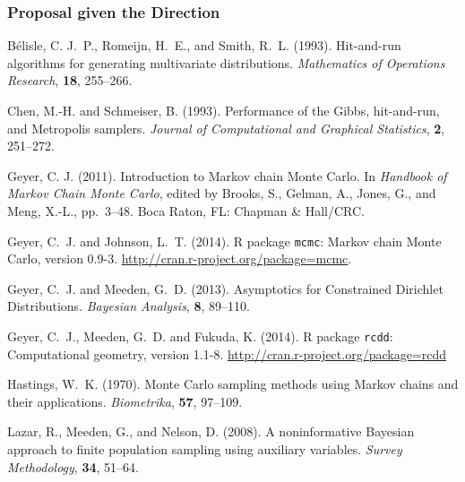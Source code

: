 \documentclass[11pt]{article}
\begin{document}
\subsubsection{Proposal given the Direction}

\begin{thebibliography}{}

B\'{e}lisle, C. J.~P., Romeijn, H.~E., and Smith, R.~L. (1993).
\newblock Hit-and-run algorithms for generating multivariate distributions.
\newblock \emph{Mathematics of Operations Research}, \textbf{18}, 255--266.

Chen, M.-H. and Schmeiser, B. (1993).
\newblock Performance of the Gibbs, hit-and-run, and Metropolis samplers.
\newblock \emph{Journal of Computational and Graphical Statistics},
   \textbf{2}, 251--272.

Geyer, C. J. (2011).
\newblock Introduction to Markov chain Monte Carlo.
\newblock In \emph{Handbook of Markov Chain Monte Carlo}, edited by
    Brooks, S., Gelman, A., Jones, G., and Meng, X.-L., pp.~3--48.
\newblock Boca Raton, FL: Chapman \& Hall/CRC.

Geyer, C.~J. and Johnson, L.~T. (2014).
\newblock R package \texttt{mcmc}: Markov chain Monte Carlo,
    version 0.9-3.
\newblock \url{http://cran.r-project.org/package=mcmc}.

Geyer, C.~J. and Meeden, G.~D. (2013).
\newblock Asymptotics for Constrained Dirichlet Distributions.
\newblock \emph{Bayesian Analysis}, \textbf{8}, 89--110.

Geyer, C.~J., Meeden, G.~D. and Fukuda, K. (2014).
\newblock R package \texttt{rcdd}: Computational geometry,
    version 1.1-8.
\newblock \url{http://cran.r-project.org/package=rcdd}

Hastings, W.~K. (1970).
\newblock Monte Carlo sampling methods using Markov chains and their
    applications.
\newblock \emph{Biometrika}, \textbf{57}, 97--109.

Lazar, R., Meeden, G., and Nelson, D. (2008).
\newblock A noninformative {B}ayesian approach to finite population sampling
  using auxiliary variables.
\newblock \emph{Survey Methodology}, \textbf{34}, 51--64.


\end{thebibliography}
\end{document}
